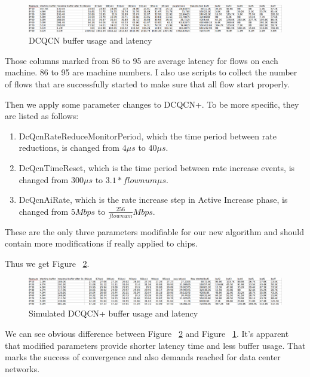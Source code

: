 \documentclass[12pt,a4paper]{article}
\begin{document}
\begin{figure}[ht]
	\begin{center}
		\includegraphics[width=6in]{default}
		\caption{DCQCN buffer usage and latency}
		\label{fig:default}
	\end{center}
\end{figure}

Those columns marked from 86 to 95 are average latency for flows on each machine.
86 to 95 are machine numbers.
I also use scripts to collect the number of flows that are successfully started to make sure that all flow start properly.

Then we apply some parameter changes to DCQCN+. To be more specific, they are listed as follows:
\begin{enumerate}
	\item DcQcnRateReduceMonitorPeriod, which the time period between rate reductions, is changed from $4\mu s$ to $40\mu s$.
	\item DcQcnTimeReset, which is the time period between rate increase events, is changed from $300\mu s$ to $3.1*flownum \mu s$.
	\item DcQcnAiRate, which is the rate increase step in Active Increase phase, is changed from $5Mbps$ to $\frac{256}{flownum} Mbps$.
\end{enumerate}
These are the only three parameters modifiable for our new algorithm and should contain more modifications if really applied to chips.

Thus we get Figure ~\ref{fig:improved}.

\begin{figure}[ht]
	\begin{center}
		\includegraphics[width=6in]{improved}
		\caption{Simulated DCQCN+ buffer usage and latency}
		\label{fig:improved}
	\end{center}
\end{figure}

We can see obvious difference between Figure ~\ref{fig:improved} and Figure ~\ref{fig:default}.
It's apparent that modified parameters provide shorter latency time and less buffer usage.
That marks the success of convergence and also demands reached for data center networks.
\end{document}
